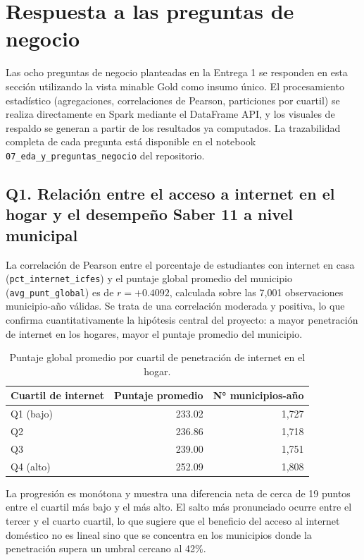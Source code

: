 \section{Respuesta a las preguntas de negocio}
Las ocho preguntas de negocio planteadas en la Entrega 1 se responden en esta sección utilizando la vista minable Gold como insumo único. El procesamiento estadístico (agregaciones, correlaciones de Pearson, particiones por cuartil) se realiza directamente en Spark mediante el DataFrame API, y los visuales de respaldo se generan a partir de los resultados ya computados. La trazabilidad completa de cada pregunta está disponible en el notebook \texttt{07\_eda\_y\_preguntas\_negocio} del repositorio.

\subsection{Q1. Relación entre el acceso a internet en el hogar y el desempeño Saber 11 a nivel municipal}
La correlación de Pearson entre el porcentaje de estudiantes con internet en casa (\texttt{pct\_internet\_icfes}) y el puntaje global promedio del municipio (\texttt{avg\_punt\_global}) es de $r = +0.4092$, calculada sobre las 7,001 observaciones municipio-año válidas. Se trata de una correlación moderada y positiva, lo que confirma cuantitativamente la hipótesis central del proyecto: a mayor penetración de internet en los hogares, mayor el puntaje promedio del municipio.

\begin{table}[H]
\centering
\caption{Puntaje global promedio por cuartil de penetración de internet en el hogar.}
\begin{tabular}{l r r}
\toprule
\textbf{Cuartil de internet} & \textbf{Puntaje promedio} & \textbf{N° municipios-año} \\
\midrule
Q1 (bajo)  & 233.02 & 1,727 \\
Q2         & 236.86 & 1,718 \\
Q3         & 239.00 & 1,751 \\
Q4 (alto)  & 252.09 & 1,808 \\
\bottomrule
\end{tabular}
\end{table}

La progresión es monótona y muestra una diferencia neta de cerca de 19 puntos entre el cuartil más bajo y el más alto. El salto más pronunciado ocurre entre el tercer y el cuarto cuartil, lo que sugiere que el beneficio del acceso al internet doméstico no es lineal sino que se concentra en los municipios donde la penetración supera un umbral cercano al 42\%.

